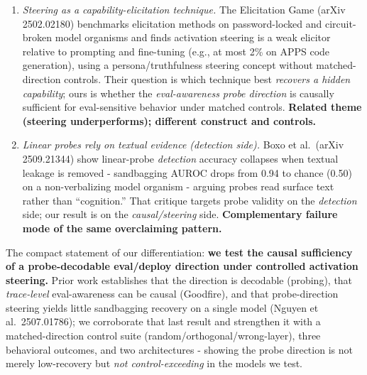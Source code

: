 \documentclass[
]{article}
\begin{document}
\begin{enumerate}
  recovery at all magnitudes (versus 83\% for a ``you are deployed''
  prompt suffix and roughly 25\% for SAE-feature steering), concluding
  the model ``[does not] use these evaluation awareness representations
  to sandbag.'' This is the closest result to ours, and our finding
  \textbf{corroborates} it. We strengthen and generalize it in three
  ways: (i) a matched-direction control suite (random, orthogonal,
  wrong-layer at equal magnitude) showing the probe direction is not
  merely low-recovery but \emph{not control-exceeding}; (ii) three
  behavioral outcomes (refusal, sandbagging, hedging) with two judges
  and a four-part success criterion, not WMDP recovery alone; (iii) two
  architectures (Qwen3-32B dense, gpt-oss-120b MoE) rather than one.
  \textbf{Corroborated; we add matched controls, behaviors, and
  cross-architecture scope.}
\item
  \emph{Steering as a capability-elicitation technique.} The Elicitation
  Game (arXiv 2502.02180) benchmarks elicitation methods on
  password-locked and circuit-broken model organisms and finds
  activation steering is a weak elicitor relative to prompting and
  fine-tuning (e.g., at most 2\% on APPS code generation), using a
  persona/truthfulness steering concept without matched-direction
  controls. Their question is which technique best \emph{recovers a
  hidden capability}; ours is whether the \emph{eval-awareness probe
  direction} is causally sufficient for eval-sensitive behavior under
  matched controls. \textbf{Related theme (steering underperforms);
  different construct and controls.}
\item
  \emph{Linear probes rely on textual evidence (detection side).} Boxo
  et al.~(arXiv 2509.21344) show linear-probe \emph{detection} accuracy
  collapses when textual leakage is removed - sandbagging AUROC drops
  from 0.94 to chance (0.50) on a non-verbalizing model organism -
  arguing probes read surface text rather than ``cognition.'' That
  critique targets probe validity on the \emph{detection} side; our
  result is on the \emph{causal/steering} side.
  \textbf{Complementary failure mode of the same overclaiming pattern.}
\end{enumerate}

The compact statement of our differentiation: \textbf{we test the causal
sufficiency of a probe-decodable eval/deploy direction under controlled
activation steering.} Prior work establishes that the direction is
decodable (probing), that \emph{trace-level} eval-awareness can be
causal (Goodfire), and that probe-direction steering yields little
sandbagging recovery on a single model (Nguyen et al.~2507.01786); we
corroborate that last result and strengthen it with a matched-direction
control suite (random/orthogonal/wrong-layer), three behavioral
outcomes, and two architectures - showing the probe direction is not
merely low-recovery but \emph{not control-exceeding} in the models we
test.
\end{document}

